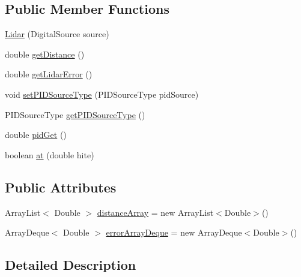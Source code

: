 \subsection*{Public Member Functions}
\begin{DoxyCompactItemize}
\item 
\mbox{\hyperlink{classorg_1_1usfirst_1_1frc3707_1_1_creedence_1_1lidar_1_1_lidar_a0971ae3017d0e24dbebe0b80a3ac24b6}{Lidar}} (Digital\+Source source)
\item 
double \mbox{\hyperlink{classorg_1_1usfirst_1_1frc3707_1_1_creedence_1_1lidar_1_1_lidar_a5d9a5bb9840870d49790080625fac6f8}{get\+Distance}} ()
\item 
double \mbox{\hyperlink{classorg_1_1usfirst_1_1frc3707_1_1_creedence_1_1lidar_1_1_lidar_a4b43b720ccd9dc55a606ba0c91b3e894}{get\+Lidar\+Error}} ()
\item 
void \mbox{\hyperlink{classorg_1_1usfirst_1_1frc3707_1_1_creedence_1_1lidar_1_1_lidar_a60d9f61d900699581636f3478d2c11f4}{set\+P\+I\+D\+Source\+Type}} (P\+I\+D\+Source\+Type pid\+Source)
\item 
P\+I\+D\+Source\+Type \mbox{\hyperlink{classorg_1_1usfirst_1_1frc3707_1_1_creedence_1_1lidar_1_1_lidar_a958a52e0a82063ef8daa2ea901659e9d}{get\+P\+I\+D\+Source\+Type}} ()
\item 
double \mbox{\hyperlink{classorg_1_1usfirst_1_1frc3707_1_1_creedence_1_1lidar_1_1_lidar_ab90708315a525426d46750ecb2f13e19}{pid\+Get}} ()
\item 
boolean \mbox{\hyperlink{classorg_1_1usfirst_1_1frc3707_1_1_creedence_1_1lidar_1_1_lidar_afaacc8fb2b3924c90c4ffc880b8bff93}{at}} (double hite)
\end{DoxyCompactItemize}
\subsection*{Public Attributes}
\begin{DoxyCompactItemize}
\item 
Array\+List$<$ Double $>$ \mbox{\hyperlink{classorg_1_1usfirst_1_1frc3707_1_1_creedence_1_1lidar_1_1_lidar_a4914c30ec8db9aa139a37e0e7531d984}{distance\+Array}} = new Array\+List$<$Double$>$()
\item 
Array\+Deque$<$ Double $>$ \mbox{\hyperlink{classorg_1_1usfirst_1_1frc3707_1_1_creedence_1_1lidar_1_1_lidar_a19af3c419d37e586077229caa597ae7d}{error\+Array\+Deque}} = new Array\+Deque$<$Double$>$()
\end{DoxyCompactItemize}


\subsection{Detailed Description}


